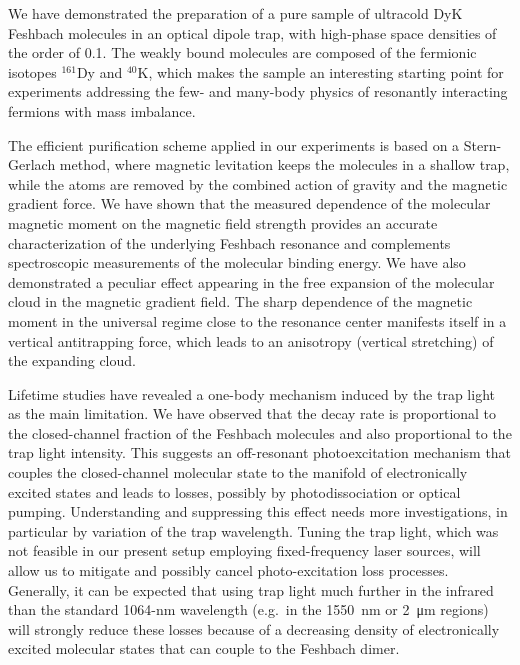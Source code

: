 We have demonstrated the preparation of a pure sample of ultracold DyK Feshbach molecules in an optical dipole trap, with high-phase space densities of the order of 0.1. The weakly bound molecules are composed of the fermionic isotopes $^{161}$Dy and $^{40}$K, which makes the sample an interesting starting point for experiments addressing the few- and many-body physics of resonantly interacting fermions with mass imbalance. 

The efficient purification scheme applied in our experiments is based on a Stern-Gerlach method, where magnetic levitation keeps the molecules in a shallow trap, while the atoms are removed by the combined action of gravity and the magnetic gradient force. We have shown that the measured dependence of the molecular magnetic moment on the magnetic field strength provides an accurate characterization of the underlying Feshbach resonance and complements spectroscopic measurements of the molecular binding energy. We have also demonstrated a peculiar effect appearing in the free expansion of the molecular cloud in the magnetic gradient field. The sharp dependence of the magnetic moment in the universal regime close to the resonance center manifests itself in a vertical antitrapping force, which leads to an anisotropy (vertical stretching) of the expanding cloud.

Lifetime studies have revealed a one-body mechanism induced by the trap light as the main limitation. We have observed that the decay rate is proportional to the closed-channel fraction of the Feshbach molecules and also proportional to the trap light intensity. This suggests an off-resonant photoexcitation mechanism that couples the closed-channel molecular state to the manifold of electronically excited states and leads to losses, possibly by photodissociation or optical pumping. Understanding and suppressing this effect needs more investigations, in particular by variation of the trap wavelength. Tuning the trap light, which was not feasible in our present setup employing fixed-frequency laser sources, will allow us to mitigate and possibly cancel photo-excitation loss processes. Generally, it can be expected that using trap light much further in the infrared than the standard 1064-nm wavelength (e.g.\ in the \SI{1550}{\nano\meter} or \SI{2}{\micro\meter} regions) will strongly reduce these losses because of a decreasing density of electronically excited molecular states that can couple to the Feshbach dimer.

